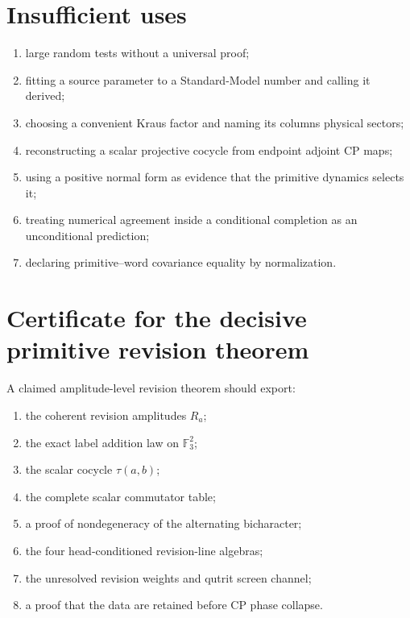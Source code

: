 \documentclass[11pt,oneside,openany]{book}
\numberwithin{equation}{chapter}
\theoremstyle{definition}
\theoremstyle{remark}
\begin{document}
\section{Insufficient uses}

\begin{enumerate}[label=\textup{(\arabic*)},leftmargin=2.2em]
\item large random tests without a universal proof;
\item fitting a source parameter to a Standard-Model number and calling it
      derived;
\item choosing a convenient Kraus factor and naming its columns physical
      sectors;
\item reconstructing a scalar projective cocycle from endpoint adjoint CP
      maps;
\item using a positive normal form as evidence that the primitive dynamics
      selects it;
\item treating numerical agreement inside a conditional completion as an
      unconditional prediction;
\item declaring primitive--word covariance equality by normalization.
\end{enumerate}

\section{Certificate for the decisive primitive revision theorem}

A claimed amplitude-level revision theorem should export:

\begin{enumerate}[label=\textup{(R\arabic*)},leftmargin=2.7em]
\item the coherent revision amplitudes \(R_a\);
\item the exact label addition law on \(\mathbb F_3^2\);
\item the scalar cocycle \(\tau(a,b)\);
\item the complete scalar commutator table;
\item a proof of nondegeneracy of the alternating bicharacter;
\item the four head-conditioned revision-line algebras;
\item the unresolved revision weights and qutrit screen channel;
\item a proof that the data are retained before CP phase collapse.
\end{enumerate}
\end{document}
